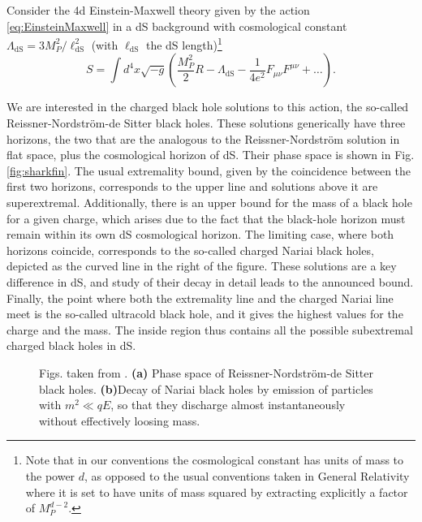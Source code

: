 \documentclass[11pt,a4paper]{article}
\begin{document}
Consider the 4d Einstein-Maxwell theory given by the action \eqref{eq:EinsteinMaxwell}  in a dS background with cosmological constant $\Lambda_{\mathrm{dS}}=3 M_P^2/ \ell^2_{\mathrm{dS}}$ (with $\ell_{\mathrm{dS}}$  the dS length)\footnote{Note that in our conventions the cosmological constant has units of mass to the power $d$, as opposed to the usual conventions taken in General Relativity where it is set to have units of mass squared by extracting explicitly a factor of $M_P^{d-2}$.}
\begin{equation}
\label{eq:EinsteinMaxwelldS}
S=\int d^{4} x \sqrt{-g}\left(\frac{M_{P}^{2}}{2}  R-\Lambda_{\mathrm{dS}}  -\frac{1}{4 e^{2}} F_{\mu \nu} F^{\mu \nu}+\ldots\right).
\end{equation}

We are interested in the charged black hole solutions to this action, the so-called Reissner-Nordstr\"om-de Sitter black holes. These solutions generically have three horizons, the two that are the analogous to the Reissner-Nordstr\"om solution in flat space, plus the cosmological horizon of dS. Their phase space is shown in Fig. \ref{fig:sharkfin}. The usual extremality bound, given by the coincidence between the first two horizons, corresponds to the upper line and solutions above it are superextremal. Additionally, there is an upper bound for the mass of a black hole for a given charge, which arises due to the fact that the black-hole horizon must remain within its own dS cosmological horizon. The limiting case, where both horizons coincide, corresponds to the so-called charged Nariai black holes, depicted as the curved line in the right of the figure. These solutions are a key difference in dS, and study of their decay in detail leads to the announced bound. Finally, the point where both the extremality line and the charged Nariai line meet is the so-called ultracold black hole, and it gives the highest values for the charge and the mass. The inside region thus contains all the possible subextremal charged black holes in dS.

\begin{figure}[t]
	\begin{center}
		\qquad \quad 
		\caption{\footnotesize  Figs. taken from \cite{Montero:2019ekk}. \textbf{(a)} Phase space of  Reissner-Nordstr\"om-de Sitter black holes. \textbf{(b)}Decay of Nariai black holes by emission of  particles with $m^2\ll qE$, so that they discharge almost instantaneously without effectively loosing mass.}
	\end{center}
\end{figure}  
\end{document}

